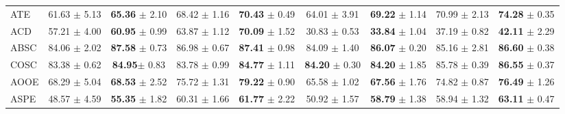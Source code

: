 \documentclass[11pt]{article}
\begin{document}
\begin{table*}[]
{\begin{tabular}{l|cccc|cccc}
ATE                            & 61.63             \tiny{$\pm$  5.13}            &\multicolumn{1}{c|}{ \textbf{65.36}        \tiny{$\pm$ 2.10}}    & 68.42          \tiny{$\pm$ 1.16}           & \textbf{70.43}        \tiny{$\pm$ 0.49}      & 64.01                 \tiny{$\pm$ 3.91}        & \multicolumn{1}{c|}{\textbf{69.22}      \tiny{$\pm$ 1.14}}            & 70.99           \tiny{$\pm$  2.13}            & \textbf{74.28}        \tiny{$\pm$ 0.35 }        \\
ACD                            & 57.21             \tiny{$\pm$  4.00}            & \multicolumn{1}{c|}{\textbf{60.95} \tiny{$\pm$ 0.99}}           & 63.87          \tiny{$\pm$ 1.12}           & \textbf{70.09}        \tiny{$\pm$ 1.52}             & 30.83                \tiny{$\pm$ 0.53}        & \multicolumn{1}{c|}{\textbf{33.84}      \tiny{$\pm$ 1.04}}             & 37.19           \tiny{$\pm$ 0.82}            & \textbf{42.11}        \tiny{$\pm$ 2.29}        \\
ABSC                           & 84.06             \tiny{$\pm$  2.02}            & \multicolumn{1}{c|}{\textbf{87.58}       \tiny{$\pm$ 0.73 } }        & 86.98           \tiny{$\pm$ 0.67}            & \textbf{87.41}      \tiny{$\pm$ 0.98}      & 84.09                \tiny{$\pm$  1.40}        & \multicolumn{1}{c|}{\textbf{86.07}     \tiny{$\pm$ 0.20}}              & 85.16           \tiny{$\pm$ 2.81}            & \textbf{86.60}        \tiny{$\pm$ 0.38}        \\
COSC                           & 83.38  \tiny{$\pm$  0.62}  &\multicolumn{1}{c|}{ \textbf{84.95}\tiny{$\pm$ 0.83} }        & 83.78           \tiny{$\pm$ 0.99}            & \textbf{84.77}     \tiny{$\pm$ 1.11}       & \textbf{84.20}        \tiny{$\pm$ 0.30}        & \multicolumn{1}{c|}{\textbf{84.20}     \tiny{$\pm$ 1.85}}          & 85.78           \tiny{$\pm$ 0.39}            & \textbf{86.55}        \tiny{$\pm$  0.37}      \\
AOOE                           & 68.29             \tiny{$\pm$  5.04}           & \multicolumn{1}{c|}{\textbf{68.53}        \tiny{$\pm$ 2.52}}              & 75.72           \tiny{$\pm$ 1.31}            & \textbf{79.22}      \tiny{$\pm$ 0.90 }      & 65.58                \tiny{$\pm$ 1.02}        & \multicolumn{1}{c|}{\textbf{67.56}     \tiny{$\pm$ 1.76}}               & 74.82            \tiny{$\pm$ 0.87}            & \textbf{76.49}        \tiny{$\pm$ 1.26}        \\
\midrule
ASPE                           & 48.57             \tiny{$\pm$  4.59}            & \multicolumn{1}{c|}{\textbf{55.35}       \tiny{$\pm$ 1.82}}  & 60.31         \tiny{$\pm$ 1.66}            & \textbf{61.77}       \tiny{$\pm$ 2.22}      & 50.92                \tiny{$\pm$ 1.57}        & \multicolumn{1}{c|}{\textbf{58.79}        \tiny{$\pm$ 1.38}}           & 58.94          \tiny{$\pm$ 1.32}            & \textbf{63.11}       \tiny{$\pm$ 0.47}      \\

\end{tabular}}
\end{table*}
\end{document}

